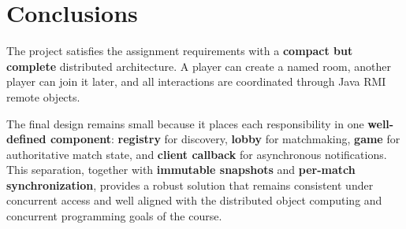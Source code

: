 \clearpage
\section{Conclusions}

The project satisfies the assignment requirements with a \textbf{compact but
complete} distributed architecture. A player can create a named room, another
player can join it later, and all interactions are coordinated through Java RMI
remote objects.

The final design remains small because it places each responsibility in one
\textbf{well-defined component}: \textbf{registry} for discovery,
\textbf{lobby} for matchmaking, \textbf{game} for authoritative match state,
and \textbf{client callback} for asynchronous notifications. This separation,
together with \textbf{immutable snapshots} and \textbf{per-match
synchronization}, provides a robust solution that remains consistent under
concurrent access and well
aligned with the distributed object computing and concurrent programming goals
of the course.
